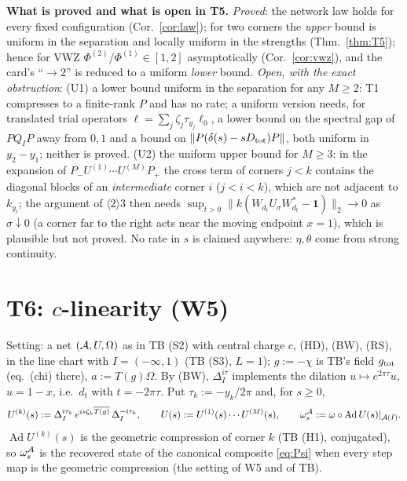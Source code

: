 \documentclass[11pt]{article}
\newcommand{\Pp}{P_+}\newcommand{\Pm}{P_-}\newcommand{\Stwo}{\mathfrak S_2}\newcommand{\Sone}{\mathfrak S_1}
\newcommand{\norm}[1]{\lVert#1\rVert}\newcommand{\abs}[1]{\lvert#1\rvert}\newcommand{\ip}[2]{\langle#1,#2\rangle}
\newcommand{\one}{\mathbf 1}\newcommand{\Om}{\Omega}\newcommand{\Gh}{\widehat G}\newcommand{\Dc}{\mathfrak D}
\newcommand{\Dtot}{D_{\rm tot}}\newcommand{\Rp}{\mathsf R}\newcommand{\Lp}{\mathsf L}\newcommand{\Sch}{\mathcal S}
\theoremstyle{definition}\newtheorem{hypothesis}[theorem]{Hypothesis}
\begin{document}
\begin{verdictgap}
\textbf{What is proved and what is open in T5.}  \emph{Proved}: the network law holds for every fixed
configuration (Cor.~\ref{cor:law}); for two corners the \emph{upper} bound is uniform in the separation
and locally uniform in the strengths (Thm.~\ref{thm:T5}); hence for VWZ $\Phi^{(2)}/\Phi^{(1)}\in[1,2]$
asymptotically (Cor.~\ref{cor:vwz}), and the card's ``$\to2$'' is reduced to a uniform \emph{lower}
bound.  \emph{Open, with the exact obstruction}: (U1) a lower bound uniform in the separation for any
$M\ge2$: T1 compresses to a finite-rank $P$ and has no rate; a uniform version needs, for translated
trial operators $\ell=\sum_j\zeta_j\tau_{y_j}\ell_0$, a lower bound on the spectral gap of $PQ_IP$ away from
$0,1$ and a bound on $\norm{P(\delta(s)-s\Dtot)P}$, both uniform in $y_2-y_1$; neither is proved.
(U2) the uniform upper bound for $M\ge3$: in the expansion of $\Pm U^{(1)}\cdots U^{(M)}\Pp$ the
cross term of corners $j<k$ contains the diagonal blocks of an \emph{intermediate} corner $i$ ($j<i<k$),
which are not adjacent to $k_{y_i}$; the argument of $\langle2\rangle3$ then needs
$\sup_{t>0}\norm{k(W_{d_t}U_\sigma W^*_{d_t}-\one)}_2\to0$ as $\sigma\downarrow0$ (a corner far to the
right acts near the moving endpoint $x=1$), which is plausible but not proved.  No rate in $s$ is
claimed anywhere: $\eta,\theta$ come from strong continuity.
\end{verdictgap}

\section{T6: $c$-linearity (W5)}\label{sec:T6}
Setting: a net $(\cA,U,\Om)$ as in TB (S2) with central charge $c$, (HD), (BW), (RS), in the line chart with
$I=(-\infty,1)$ (TB (S3), $L=1$); $g:=-\chi$ is TB's field $g_{\rm tot}$ (eq.~(chi) there), $a:=T(g)\Om$.  By (BW),
$\Delta_I^{i\tau}$ implements the dilation $u\mapsto e^{2\pi\tau}u$, $u=1-x$, i.e.\ $d_t$ with $t=-2\pi\tau$.  Put
$\tau_k:=-y_k/2\pi$ and, for $s\ge0$,
\begin{equation}\label{eq:Ugen}
 U^{(k)}(s):=\Delta_I^{i\tau_k}\,e^{is\zeta_k\overline{T(g)}}\,\Delta_I^{-i\tau_k},\qquad
 U(s):=U^{(1)}(s)\cdots U^{(M)}(s),\qquad \omega^{\mathcal A}_s:=\omega\circ\operatorname{Ad}U(s)|_{\mathcal A(I)} .
\end{equation}
$\operatorname{Ad}U^{(k)}(s)$ is the geometric compression of corner $k$ (TB (H1), conjugated), so
$\omega^{\mathcal A}_s$ is the recovered state of the canonical composite \eqref{eq:Psi} when every step map is
the geometric compression (the setting of W5 and of TB).
\end{document}
